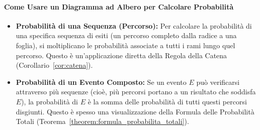 \paragraph{Come Usare un Diagramma ad Albero per Calcolare Probabilità}
\begin{itemize}
    \item \textbf{Probabilità di una Sequenza (Percorso):} Per calcolare la probabilità di una specifica sequenza di esiti (un percorso completo dalla radice a una foglia), si moltiplicano le probabilità associate a tutti i rami lungo quel percorso. Questo è un'applicazione diretta della Regola della Catena (Corollario~\ref{cor:catena}).
    \item \textbf{Probabilità di un Evento Composto:} Se un evento $E$ può verificarsi attraverso più sequenze (cioè, più percorsi portano a un risultato che soddisfa $E$), la probabilità di $E$ è la somma delle probabilità di tutti questi percorsi disgiunti. Questo è spesso una visualizzazione della Formula delle Probabilità Totali (Teorema~\ref{theorem:formula_probabilita_totali}).
\end{itemize}

